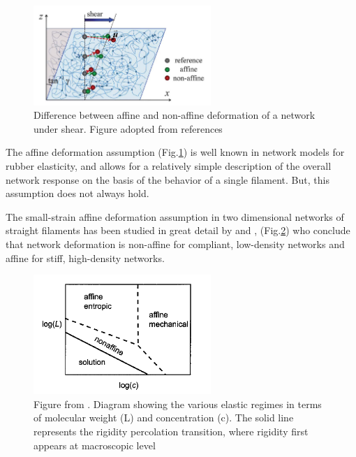  \begin{figure}[ht]
\begin{center}
\includegraphics[width=0.6\textwidth]{Figures/chapter-intro/nonaffine.png}%

\caption[Affine and non-affine deformations]{ Difference between affine
and non-affine deformation of a network under shear. Figure adopted from
references \citep{wen_non-affine_2012,basu_nonaffine_2011}
}
\label{fig:nonaffine}
\end{center}
\end{figure}
The affine deformation assumption (Fig.\ref{fig:nonaffine}) is well known in
network models for rubber elasticity, and allows for a relatively simple description of the overall network response on the basis of the  behavior
of a single filament. But, this assumption does not always hold.

The small-strain affine deformation assumption in two dimensional
networks of straight filaments has
been studied in great detail by \citet{head_distinct_2003,head_mechanical_2005}
and \citet{wilhelm_elasticity_2003}, (Fig.\ref{fig:nonaffine-head}) who conclude
that network deformation is non-affine for compliant, low-density networks
and affine for stiff, high-density networks.
 \begin{figure}[ht]
\begin{center}
\includegraphics[width=0.6\textwidth]{Figures/chapter-intro/nonaffine-head.png}%

\caption[Affine and non-affine phases]{ Figure from
\citet{head_mechanical_2005}. Diagram showing the various elastic regimes in
terms of molecular weight (L) and concentration (c). The solid line represents
the rigidity percolation transition, where rigidity first appears at
macroscopic level}
\label{fig:nonaffine-head}
\end{center}
\end{figure} 

